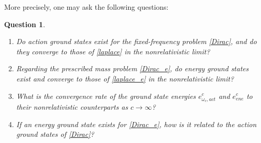 \documentclass{amsart}
\theoremstyle{plain}
\newtheorem{question}[theorem]{Question}
\theoremstyle{definition}
\theoremstyle{remark}
\numberwithin{equation}{section} \numberwithin{figure}{section}
\begin{document}
More precisely, one may ask the following questions:
\begin{question}\label{Q1}
  \normalfont %
  \quad
  \begin{enumerate}
    \item Do action ground states exist for the fixed-frequency problem \eqref{Dirac}, and do they converge to those of \eqref{laplace} in the nonrelativistic limit?
    \item Regarding the prescribed mass problem \eqref{Dirac_e}, do energy ground states exist and converge to those of \eqref{laplace_e} in the nonrelativistic limit?
    \item What is the convergence rate of the ground state energies \(e^{c}_{\omega_c,{act}}\) and \(e^{c}_{{ene}}\) to their nonrelativistic counterparts as \(c \to \infty\)?
    \item If an energy ground state exists for \eqref{Dirac_e}, how is it related to the action ground states of \eqref{Dirac}?
    \end{enumerate}
\end{question}
\end{document}

